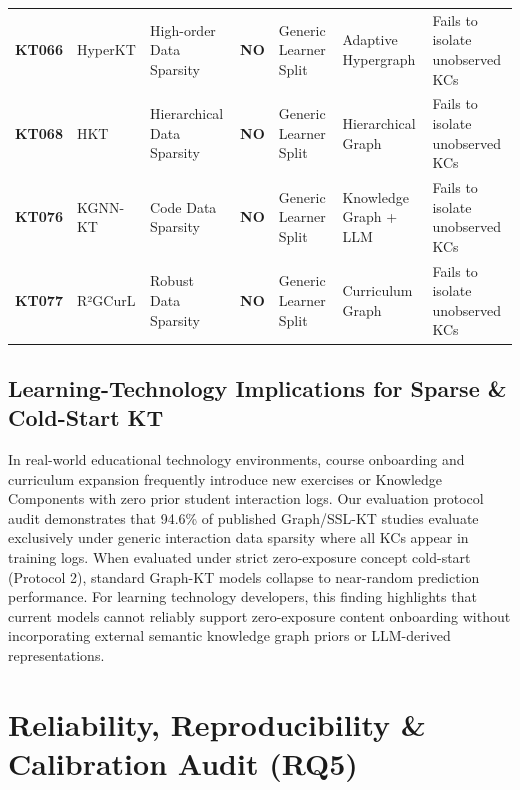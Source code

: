 \documentclass[journal]{IEEEtran}
\begin{document}
\begin{table}[t]
{\begin{tabular}{lllllll}
\textbf{KT066} & HyperKT \cite{KT066_HyperKT_2025} & High-order Data Sparsity & \textbf{NO} & Generic Learner Split & Adaptive Hypergraph & Fails to isolate unobserved KCs \\
\textbf{KT068} & HKT \cite{KT068_HKT_2025} & Hierarchical Data Sparsity & \textbf{NO} & Generic Learner Split & Hierarchical Graph & Fails to isolate unobserved KCs \\
\textbf{KT076} & KGNN-KT \cite{KT076_KGNNKT_2025} & Code Data Sparsity & \textbf{NO} & Generic Learner Split & Knowledge Graph + LLM & Fails to isolate unobserved KCs \\
\textbf{KT077} & R²GCurL \cite{KT077_R2GCurL_2026} & Robust Data Sparsity & \textbf{NO} & Generic Learner Split & Curriculum Graph & Fails to isolate unobserved KCs \\
\bottomrule
\end{tabular}
}
\end{table}

\subsection{Learning-Technology Implications for Sparse \& Cold-Start KT}
In real-world educational technology environments, course onboarding and curriculum expansion frequently introduce new exercises or Knowledge Components with zero prior student interaction logs. Our evaluation protocol audit demonstrates that 94.6\% of published Graph/SSL-KT studies evaluate exclusively under generic interaction data sparsity where all KCs appear in training logs. When evaluated under strict zero-exposure concept cold-start (Protocol 2), standard Graph-KT models collapse to near-random prediction performance. For learning technology developers, this finding highlights that current models cannot reliably support zero-exposure content onboarding without incorporating external semantic knowledge graph priors or LLM-derived representations.

\section{Reliability, Reproducibility \& Calibration Audit (RQ5)}
\label{sec:reliability}
\end{document}

